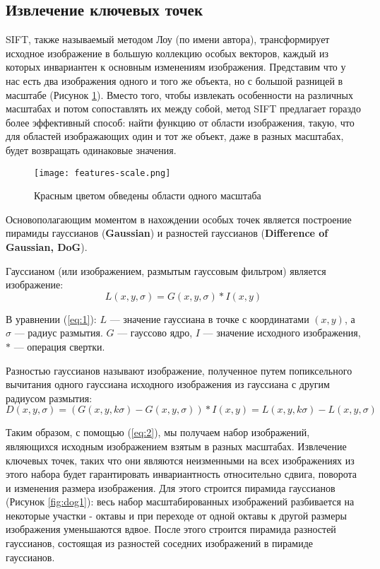 \subsection{Извлечение ключевых точек}

SIFT, также называемый методом Лоу (по имени автора), трансформирует исходное изображение в большую коллекцию особых векторов, каждый из которых инвариантен к основным изменениям изображения. Представим что у нас есть два изображения одного и того же объекта, но с большой разницей в масштабе (Рисунок \ref{fig:scale}). Вместо того, чтобы извлекать особенности на различных масштабах и потом сопоставлять их между собой, метод SIFT предлагает гораздо более эффективный способ: найти функцию от области изображения, такую, что для областей изображающих один и тот же объект, даже в разных масштабах, будет возвращать одинаковые значения.

\begin{figure}[h]
    \centering
    \texttt{[image: features-scale.png]}
    \caption{Красным цветом обведены области одного масштаба}
    \label{fig:scale}
\end{figure}


Основополагающим моментом в нахождении особых точек является построение пирамиды гауссианов (\textbf{Gaussian}) и разностей гауссианов (\textbf{Difference of Gaussian, DoG}).

Гауссианом (или изображением, размытым гауссовым фильтром) является изображение:
\begin{equation} \label{eq:1}
    L(x,y,\sigma) = G(x,y,\sigma) * I(x,y)
\end{equation}

В уравнении (\ref{eq:1}): $L$ — значение гауссиана в точке с координатами $(x,y)$, а $\sigma$ — радиус размытия. $G$ — гауссово ядро, $I$ — значение исходного изображения, $*$ — операция свертки.

Разностью гауссианов называют изображение, полученное путем попиксельного вычитания одного гауссиана исходного изображения из гауссиана с другим радиусом размытия:
\begin{equation} \label{eq:2}
    D(x,y,\sigma) = (G(x,y,k\sigma)-G(x,y,\sigma)) * I(x,y) = L(x,y,k\sigma) - L(x,y,\sigma)
\end{equation}

Таким образом, с помощью (\ref{eq:2}), мы получаем набор изображений, являющихся исходным изображением взятым в разных масштабах. Извлечение ключевых точек, таких что они являются неизменными на всех изображениях из этого набора будет гарантировать инвариантность относительно сдвига, поворота и изменения размера изображения. Для этого строится пирамида гауссианов (Рисунок \ref{fig:dog1}): весь набор масштабированных изображений разбивается на некоторые участки - октавы и при переходе от одной октавы к другой размеры изображения уменьшаются вдвое. После этого строится пирамида разностей гауссианов, состоящая из разностей соседних изображений в пирамиде гауссианов.

